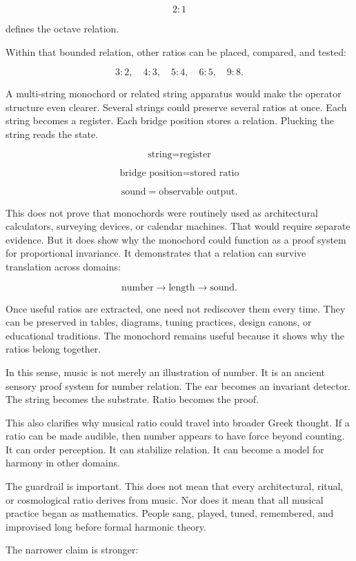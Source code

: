 \documentclass[11pt]{book}
\begin{document}
\[
2:1
\]

defines the octave relation.

Within that bounded relation, other ratios can be placed, compared, and tested:

\[
3:2,
\quad
4:3,
\quad
5:4,
\quad
6:5,
\quad
9:8.
\]

A multi-string monochord or related string apparatus would make the operator structure even clearer. Several strings could preserve several ratios at once. Each string becomes a register.  Each bridge position stores a relation. Plucking the string reads the state.

\[
\text{string} = \text{register}
\]

\[
\text{bridge position} = \text{stored ratio}
\]

\[
\text{sound} = \text{observable output}.
\]

This does not prove that monochords were routinely used as architectural calculators, surveying devices, or calendar machines. That would require separate evidence. But it does show why the monochord could function as a proof system for proportional invariance. It demonstrates that a relation can survive translation across domains:

\[
\text{number}
\rightarrow
\text{length}
\rightarrow
\text{sound}.
\]

Once useful ratios are extracted, one need not rediscover them every time. They can be preserved in tables, diagrams, tuning practices, design canons, or educational traditions. The monochord remains useful because it shows why the ratios belong together.

In this sense, music is not merely an illustration of number. It is an ancient sensory proof system for number relation. The ear becomes an invariant detector. The string becomes the substrate.  Ratio becomes the proof.

This also clarifies why musical ratio could travel into broader Greek thought. If a ratio can be made audible, then number appears to have force beyond counting. It can order perception. It can stabilize relation. It can become a model for harmony in other domains.

The guardrail is important. This does not mean that every architectural, ritual, or cosmological ratio derives from music. Nor does it mean that all musical practice began as mathematics.  People sang, played, tuned, remembered, and improvised long before formal harmonic theory.

The narrower claim is stronger:
\end{document}
